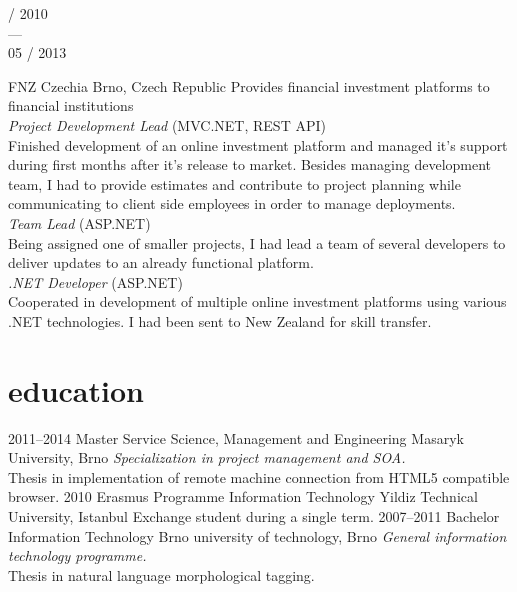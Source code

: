 \documentclass[]{friggeri-cv} %
\begin{document}
\begin{entrylist}
\entry
{\parbox[t]{2cm}{ / 2010 \\ --- \\ 05 / 2013}}
{FNZ Czechia}
{Brno, Czech Republic}
{Provides financial investment platforms to financial institutions\medskip\\
\emph{Project Development Lead} (MVC.NET, REST API) \\
Finished development of an online investment platform and managed it's support during first months after it's release to market. Besides managing development team, I had to provide estimates and contribute to project planning while communicating to client side employees in order to manage deployments. \smallskip\\
\emph{Team Lead} (ASP.NET) \\
Being assigned one of smaller projects, I had lead a team of several developers to deliver updates to an already functional platform. \smallskip\\
\emph{.NET Developer} (ASP.NET) \\
Cooperated in development of multiple online investment platforms using various .NET technologies. I had been sent to New Zealand for skill transfer. \medskip
}
\end{entrylist}



\newpage
\section{education}

\begin{entrylist}
\entry
{2011--2014}
{Master {\normalfont Service Science, Management and Engineering}}
{Masaryk University, Brno}
{\emph{Specialization in project management and SOA.} \\ Thesis in implementation of remote machine connection from HTML5 compatible browser.}
\entry
{2010}
{Erasmus Programme {\normalfont Information Technology}}
{Yildiz Technical University, Istanbul}
{Exchange student during a single term.}
\entry
{2007--2011}
{Bachelor {\normalfont Information Technology}}
{Brno university of technology, Brno}
{\emph{General information technology programme.} \\ Thesis in natural language morphological tagging.}
\end{entrylist}
\end{document}
